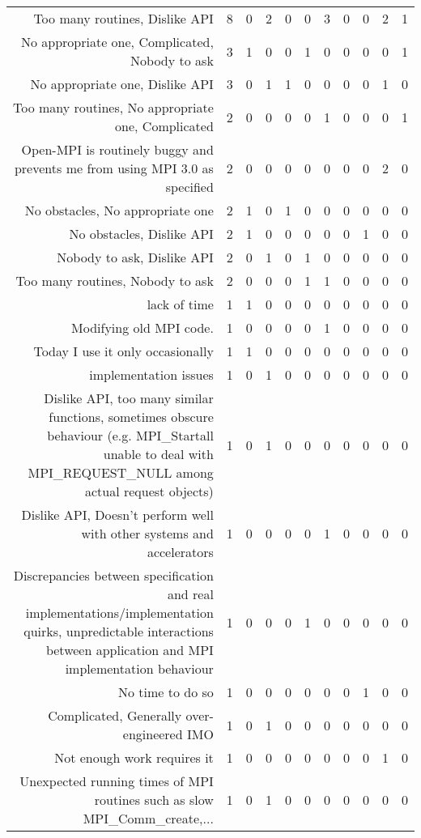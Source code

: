 {\begin{landscape}
\begin{longtable}[htb]{r|c|c|c|c|c|c|c|c|c|c}
{Too many routines, Dislike API} & 8 & 0 & 2 & 0 & 0 & 3 & 0 & 0 & 2 & 1 \\%
{No appropriate one, Complicated, Nobody to ask} & 3 & 1 & 0 & 0 & 1 & 0 & 0 & 0 & 0 & 1 \\%
{No appropriate one, Dislike API} & 3 & 0 & 1 & 1 & 0 & 0 & 0 & 0 & 1 & 0 \\%
{Too many routines, No appropriate one, Complicated} & 2 & 0 & 0 & 0 & 0 & 1 & 0 & 0 & 0 & 1 \\%
{Open-MPI is routinely buggy and prevents me from using MPI 3.0 as specified} & 2 & 0 & 0 & 0 & 0 & 0 & 0 & 0 & 2 & 0 \\%
{No obstacles, No appropriate one} & 2 & 1 & 0 & 1 & 0 & 0 & 0 & 0 & 0 & 0 \\%
{No obstacles, Dislike API} & 2 & 1 & 0 & 0 & 0 & 0 & 0 & 1 & 0 & 0 \\%
{Nobody to ask, Dislike API} & 2 & 0 & 1 & 0 & 1 & 0 & 0 & 0 & 0 & 0 \\%
{Too many routines, Nobody to ask} & 2 & 0 & 0 & 0 & 1 & 1 & 0 & 0 & 0 & 0 \\%
{lack of time} & 1 & 1 & 0 & 0 & 0 & 0 & 0 & 0 & 0 & 0 \\%
{Modifying old MPI code.} & 1 & 0 & 0 & 0 & 0 & 1 & 0 & 0 & 0 & 0 \\%
{Today I use it only occasionally} & 1 & 1 & 0 & 0 & 0 & 0 & 0 & 0 & 0 & 0 \\%
{implementation issues} & 1 & 0 & 1 & 0 & 0 & 0 & 0 & 0 & 0 & 0 \\%
{Dislike API, too many similar functions, sometimes obscure behaviour (e.g. MPI\_Startall unable to deal with MPI\_REQUEST\_NULL among actual request objects)} & 1 & 0 & 1 & 0 & 0 & 0 & 0 & 0 & 0 & 0 \\%
{Dislike API, Doesn't perform well with other systems and accelerators} & 1 & 0 & 0 & 0 & 0 & 1 & 0 & 0 & 0 & 0 \\%
{Discrepancies between specification and real implementations/implementation quirks, unpredictable interactions between application and MPI implementation behaviour} & 1 & 0 & 0 & 0 & 1 & 0 & 0 & 0 & 0 & 0 \\%
{No time to do so} & 1 & 0 & 0 & 0 & 0 & 0 & 0 & 1 & 0 & 0 \\%
{Complicated, Generally over-engineered IMO} & 1 & 0 & 1 & 0 & 0 & 0 & 0 & 0 & 0 & 0 \\%
{Not enough work requires it} & 1 & 0 & 0 & 0 & 0 & 0 & 0 & 0 & 1 & 0 \\%
{Unexpected running times of MPI routines such as slow MPI\_Comm\_create,...} & 1 & 0 & 1 & 0 & 0 & 0 & 0 & 0 & 0 & 0 \\%

\end{longtable}
\end{landscape}}
